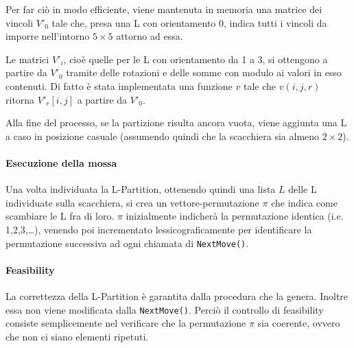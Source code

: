 Per far ciò in modo efficiente, viene mantenuta in memoria una matrice dei vincoli $V'_0$ tale che, presa una L con orientamento 0, indica tutti i vincoli da imporre nell'intorno $5\times 5$ attorno ad essa. 

Le matrici $V'_i$, cioè quelle per le L con orientamento da 1 a 3, si ottengono a partire da $V'_0$ tramite delle rotazioni e delle somme con modulo ai valori in esso contenuti. Di fatto è stata implementata una funzione $v$ tale che $v(i,j,r)$ ritorna $V'_r[i,j]$ a partire da $V'_0$.

Alla fine del processo, se la partizione risulta ancora vuota, viene aggiunta una L a caso in posizione casuale (assumendo quindi che la scacchiera sia almeno $2\times 2$).


\paragraph{Esecuzione della mossa}
Una volta individuata la L-Partition, ottenendo quindi una lista $L$ delle L individuate sulla scacchiera, si crea un vettore-permutazione $\pi$ che indica come scambiare le L fra di loro. $\pi$ inizialmente indicherà la permutazione identica (i.e. 1,2,3,\dots ), venendo poi incrementato lessicograficamente per identificare la permutazione successiva ad ogni chiamata di \texttt{NextMove()}. 

\paragraph{Feasibility} La correttezza della L-Partition è garantita dalla procedura che la genera. Inoltre essa non viene modificata dalla \texttt{NextMove()}. Perciò il controllo di feasibility consiste semplicemente nel verificare che la permutazione $\pi$ sia coerente, ovvero che non ci siano elementi ripetuti.




